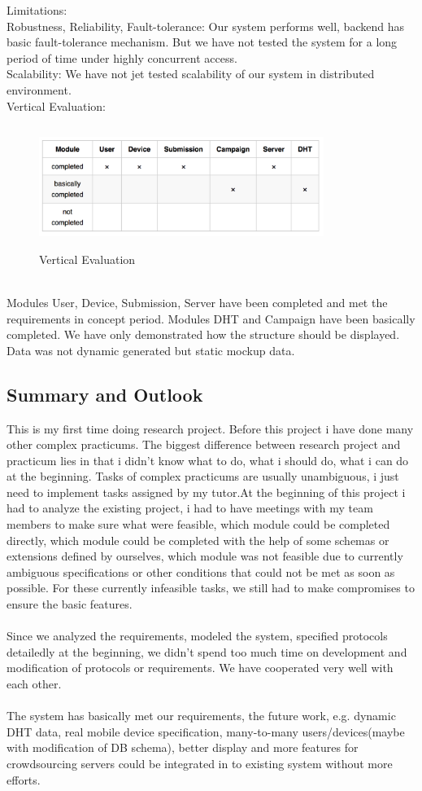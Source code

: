 \documentclass[12pt,oneside,a4paper]{article}
\begin{document}
Limitations:\\
Robustness, Reliability, Fault-tolerance: Our system performs well, backend has basic fault-tolerance mechanism. But we have not tested the system for a long period of time under highly concurrent access.\\
Scalability: We have not jet tested scalability of our system in distributed environment.\\
Vertical Evaluation:\\
\begin{figure}[htb]
\centering
\includegraphics[width=350px, height=150px]{evaluation2.png}
\caption{Vertical Evaluation}
\label{picture-label19}
\end{figure}\\

Modules User, Device, Submission, Server have been completed and met the requirements in concept period. Modules DHT and Campaign have been basically completed. We have only demonstrated how the structure should be displayed. Data was not dynamic generated but static mockup data.
\subsection{\large Summary and Outlook}
This is my first time doing research project. Before this project i have done many other complex practicums. The biggest difference between research project and practicum lies in that i didn't know what to do, what i should do, what i can do at the beginning. Tasks of complex practicums are usually unambiguous, i just need to implement tasks assigned by my tutor.At the beginning of this project i had to analyze the existing project, i had to have meetings with my team members to make sure what were feasible, which module could be completed directly, which module could be completed with the help of some schemas or extensions defined by ourselves, which module was not feasible due to currently ambiguous specifications or other conditions that could not be met as soon as possible. For these currently infeasible tasks, we still had to make compromises to ensure the basic features.\\\\
Since we analyzed the requirements, modeled the system, specified protocols detailedly at the beginning,  we didn't spend too much time on development and modification of protocols or requirements. We have cooperated very well with each other.\\\\
The system has basically met our requirements, the future work, e.g. dynamic DHT data, real mobile device specification, many-to-many users/devices(maybe with modification of DB schema), better display and more features for crowdsourcing servers could be integrated in to existing system without more efforts.
\end{document}
